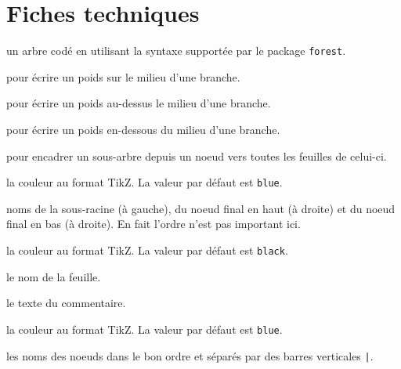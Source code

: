 \documentclass[12pt,a4paper]{article}
\begin{document}

\section{Fiches techniques}



\Content{} un arbre codé en utilisant la syntaxe supportée par le package \verb+forest+.

\extraspace

  pour écrire un poids sur le milieu d'une branche.

 pour écrire un poids au-dessus le milieu d'une branche.

 pour écrire un poids en-dessous du milieu d'une branche.

\extraspace

 pour encadrer un sous-arbre depuis un noeud vers toutes les feuilles de celui-ci.


\separation


 \hfill {}

\IDoption{} la couleur au format TikZ. La valeur par défaut est \verb#blue#.

 noms de la sous-racine (à gauche), du noeud final en haut (à droite) et du noeud final en bas (à droite). En fait l'ordre n'est pas important ici.


\separation



\IDoption{} la couleur au format TikZ. La valeur par défaut est \verb#black#.

 le nom de la feuille.

 le texte du commentaire.


\separation





\IDoption{} la couleur au format TikZ. La valeur par défaut est \verb#blue#.

\IDarg{} les noms des noeuds dans le bon ordre et séparés par des barres verticales \verb#|#.
\end{document}
